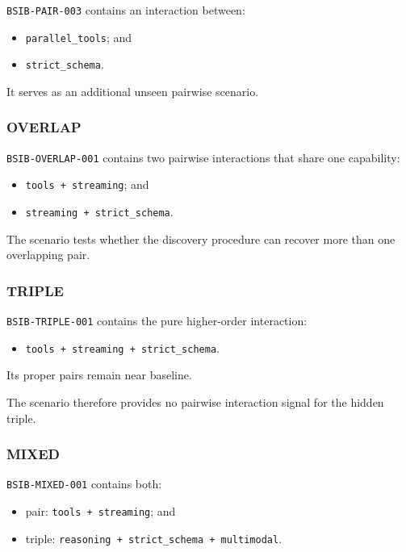 \texttt{BSIB-PAIR-003} contains an interaction between:

\begin{itemize}
\tightlist
\item
  \texttt{parallel\_tools}; and
\item
  \texttt{strict\_schema}.
\end{itemize}

It serves as an additional unseen pairwise scenario.

\subsubsection{OVERLAP}

\texttt{BSIB-OVERLAP-001} contains two pairwise interactions that share one capability:

\begin{itemize}
\tightlist
\item
  \texttt{tools\ +\ streaming}; and
\item
  \texttt{streaming\ +\ strict\_schema}.
\end{itemize}

The scenario tests whether the discovery procedure can recover more than one overlapping pair.

\subsubsection{TRIPLE}

\texttt{BSIB-TRIPLE-001} contains the pure higher-order interaction:

\begin{itemize}
\tightlist
\item
  \texttt{tools\ +\ streaming\ +\ strict\_schema}.
\end{itemize}

Its proper pairs remain near baseline.

The scenario therefore provides no pairwise interaction signal for the hidden triple.

\subsubsection{MIXED}

\texttt{BSIB-MIXED-001} contains both:

\begin{itemize}
\tightlist
\item
  pair: \texttt{tools\ +\ streaming}; and
\item
  triple: \texttt{reasoning\ +\ strict\_schema\ +\ multimodal}.
\end{itemize}

